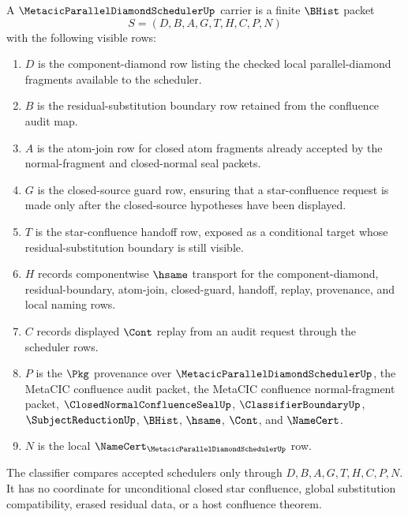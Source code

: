 \begin{definition}
\label{def:metacic-parallel-diamond-scheduler-carrier}
A $\MetacicParallelDiamondSchedulerUp$ carrier is a finite $\BHist$ packet
$$
S=(D,B,A,G,T,H,C,P,N)
$$
with the following visible rows:
\begin{enumerate}
\item $D$ is the component-diamond row listing the checked local parallel-diamond fragments available to the scheduler.
\item $B$ is the residual-substitution boundary row retained from the confluence audit map.
\item $A$ is the atom-join row for closed atom fragments already accepted by the normal-fragment and closed-normal seal packets.
\item $G$ is the closed-source guard row, ensuring that a star-confluence request is made only after the closed-source hypotheses have been displayed.
\item $T$ is the star-confluence handoff row, exposed as a conditional target whose residual-substitution boundary is still visible.
\item $H$ records componentwise $\hsame$ transport for the component-diamond, residual-boundary, atom-join, closed-guard, handoff, replay, provenance, and local naming rows.
\item $C$ records displayed $\Cont$ replay from an audit request through the scheduler rows.
\item $P$ is the $\Pkg$ provenance over $\MetacicParallelDiamondSchedulerUp$, the MetaCIC confluence audit packet, the MetaCIC confluence normal-fragment packet, $\ClosedNormalConfluenceSealUp$, $\ClassifierBoundaryUp$, $\SubjectReductionUp$, $\BHist$, $\hsame$, $\Cont$, and $\NameCert$.
\item $N$ is the local $\NameCert_{\MetacicParallelDiamondSchedulerUp}$ row.
\end{enumerate}
The classifier compares accepted schedulers only through $D,B,A,G,T,H,C,P,N$. It has no coordinate for unconditional closed star confluence, global substitution compatibility, erased residual data, or a host confluence theorem.
\end{definition}

